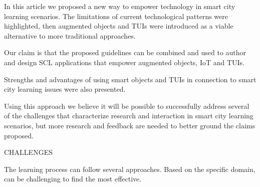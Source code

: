In this article we proposed a new way to empower technology in smart city learning scenarios. The limitations of current technological patterns were highlighted, then augmented objects and TUIs were introduced as a viable alternative to more traditional approaches.

Our claim is that the proposed guidelines can be combined and used to author and design SCL applications that empower augmented objects, IoT and TUIs.

Strengths and advantages of using smart objects and TUIs in connection to smart city learning issues were also presented.

Using this approach we believe it will be possible to successfully address several of the challenges that characterize research and interaction in smart city learning scenarios, but more research and feedback are needed to better ground the claims proposed.

CHALLENGES

The learning process can follow several approaches. Based on the specific domain, can be challenging to find the most effective.